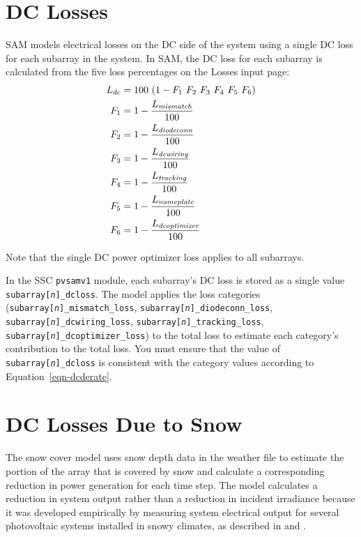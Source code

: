 \documentclass[12pt,letterpaper]{article}
\begin{document}
\section{DC Losses} \label{sec-dclosses}

SAM models electrical losses on the DC side of the system using a single DC loss for each subarray in the system. In SAM, the DC loss for each subarray is calculated from the five loss percentages on the Losses input page:
\begin{align}\label{eqn-dcderate}
L_{dc} &= 100~(1-F_1~F_2~F_3~F_4~F_5~F_6) \notag\\
F_{1} &= 1-\frac{L_{\textit{mismatch}}}{100} \notag\\
F_{2} &= 1-\frac{L_{\textit{diodeconn}}}{100} \notag\\
F_{3} &= 1-\frac{L_{\textit{dcwiring}}}{100} \notag\\
F_{4} &= 1-\frac{L_{\textit{tracking}}}{100} \notag\\
F_{5} &= 1-\frac{L_{\textit{nameplate}}}{100} \notag\\
F_{6} &= 1-\frac{L_{\textit{dcoptimizer}}}{100}
\end{align}

Note that the single DC power optimizer loss applies to all subarrays.

In the SSC \texttt{pvsamv1} module, each subarray's DC loss is stored as a single value \texttt{subarray[\textit{n}]\_dcloss}. The model applies the loss categories (\texttt{subarray[\textit{n}]\_mismatch\_loss}, \texttt{subarray[\textit{n}]\_diodeconn\_loss}, \texttt{subarray[\textit{n}]\_dcwiring\_loss}, \texttt{subarray[\textit{n}]\_tracking\_loss}, \texttt{subarray[\textit{n}]\_dcoptimizer\_loss}) to the total loss to estimate each category's contribution to the total loss. You must ensure that the value of \texttt{subarray[\textit{n}]\_dcloss} is consistent with the category values according to Equation~\ref{eqn-dcderate}.

\section{DC Losses Due to Snow}\label{sec-snow}

The snow cover model uses snow depth data in the weather file to estimate the portion of the array that is covered by snow and calculate a corresponding reduction in power generation for each time step. The model calculates a reduction in system output rather than a reduction in incident irradiance because it was developed empirically by measuring system electrical output for several photovoltaic systems installed in snowy climates, as described in \citet{marion-snowmodel} and \citet{ryberg-snowmodel}.
\end{document}
